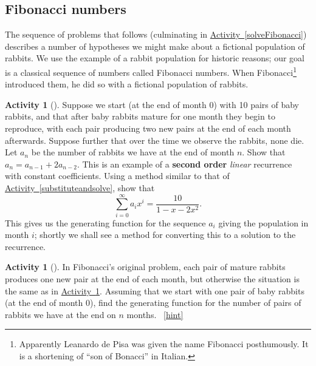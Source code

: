 \documentclass[10pt,]{book}
\newcommand{\terminology}[1]{\textbf{#1}}
\theoremstyle{plain}
\theoremstyle{definition}
\theoremstyle{definition}
\theoremstyle{definition}
\newtheorem{activity}[project]{Activity}
\numberwithin{equation}{chapter}
\begin{document}
\subsection[{Fibonacci numbers}]{Fibonacci numbers}\label{subsection-26}
\hypertarget{p-929}{}%
The sequence of problems that follows (culminating in \hyperref[solveFibonacci]{Activity~\ref{solveFibonacci}}) describes a number of hypotheses we might make about a fictional population of rabbits. We use the example of a rabbit population for historic reasons; our goal is a classical sequence of numbers called Fibonacci numbers. When Fibonacci\footnote{Apparently Leanardo de Pisa was given the name Fibonacci posthumously. It is a shortening of ``son of Bonacci'' in Italian.\label{fn-9}} introduced them, he did so with a fictional population of rabbits.%
\begin{activity}[]\label{secondorderintroduction}
\hypertarget{p-930}{}%
Suppose we start (at the end of month 0) with 10 pairs of baby rabbits, and that after baby rabbits mature for one month they begin to reproduce, with each pair producing two new pairs at the end of each month afterwards. Suppose further that over the time we observe the rabbits, none die. Let \(a_n\) be the number of rabbits we have at the end of month \(n\). Show that \(a_n=a_{n-1} + 2a_{n-2}\). This is an example of a \terminology{second order} \emph{linear} recurrence with constant coefficients. Using a method similar to that of \hyperref[substituteandsolve]{Activity~\ref{substituteandsolve}}, show that%
\begin{equation*}
\sum_{i=0}^\infty a_ix^i = \frac{10}{1-x-2x^2}.
\end{equation*}
This gives us the generating function for the sequence \(a_i\) giving the population in month \(i\); shortly we shall see a method for converting this to a solution to the recurrence.%
\end{activity}
\begin{activity}[]\label{originalFibonacci}
\hypertarget{p-932}{}%
In Fibonacci's original problem, each pair of mature rabbits produces one new pair at the end of each month, but otherwise the situation is the same as in \hyperref[secondorderintroduction]{Activity~\ref{secondorderintroduction}}.  Assuming that we start with one pair of baby rabbits (at the end of month 0), find the generating function for the number of pairs of rabbits we have at the end on \(n\) months.%
~\hfill{\tiny\hyperlink{a-199}{[hint]}\hypertarget{q-199}{}}\end{activity}
\end{document}
